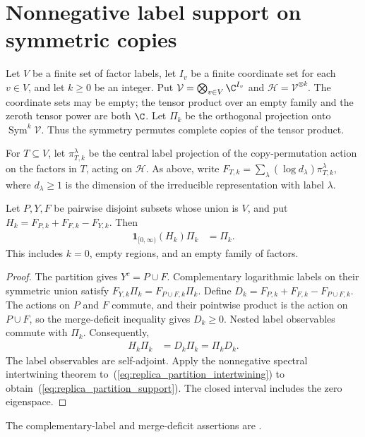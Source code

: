 \section{Nonnegative label support on symmetric copies}
\label{sec:replica_partition_nonnegative_support}

Let $V$ be a finite set of factor labels, let $I_v$ be a finite coordinate
set for each $v\in V$, and let $k\geq0$ be an integer. Put
$\mathcal V=\bigotimes_{v\in V}\C^{I_v}$ and
$\mathcal H=\mathcal V^{\otimes k}$. The coordinate sets may be empty;
the tensor product over an empty family and the zeroth tensor power are
both $\C$. Let $\Pi_k$ be the orthogonal projection onto
$\operatorname{Sym}^k\mathcal V$. Thus the symmetry permutes complete
copies of the tensor product.

For $T\subseteq V$, let $\pi^\lambda_{T,k}$ be the central label projection
of the copy-permutation action on the factors in $T$, acting on
$\mathcal H$. As above, write
$F_{T,k}=\sum_\lambda(\log d_\lambda)\pi^\lambda_{T,k}$, where
$d_\lambda\geq1$ is the dimension of the irreducible representation
with label $\lambda$.

\begin{theorem}
    \label{thm:replica_partition_nonnegative_support}
    \leanok
    Let $P,Y,F$ be pairwise disjoint subsets whose union is $V$, and put
    $H_k=F_{P,k}+F_{F,k}-F_{Y,k}$. Then
    \begin{align}
        \mathbf1_{[0,\infty)}(H_k)\Pi_k & =\Pi_k.
        \label{eq:replica_partition_support}
    \end{align}
    This includes $k=0$, empty regions, and an empty family of factors.
\end{theorem}

\begin{proof}\leanok
    The partition gives $Y^c=P\cup F$. Complementary logarithmic labels
    on their symmetric union satisfy
    $F_{Y,k}\Pi_k=F_{P\cup F,k}\Pi_k$.
    Define $D_k=F_{P,k}+F_{F,k}-F_{P\cup F,k}$.
    The actions on $P$ and $F$ commute, and their pointwise product is
    the action on $P\cup F$, so the merge-deficit inequality gives
    $D_k\geq0$. Nested label observables commute with $\Pi_k$.
    Consequently,
    \begin{align}
        H_k\Pi_k & =D_k\Pi_k=\Pi_kD_k.
        \label{eq:replica_partition_intertwining}
    \end{align}
    The label observables are self-adjoint. Apply the nonnegative
    spectral intertwining theorem to~(\ref{eq:replica_partition_intertwining})
    to obtain~(\ref{eq:replica_partition_support}). The closed interval
    includes the zero eigenspace.
\end{proof}

The complementary-label and merge-deficit assertions are
\cite[Lemma~6.1(2--3)]{OpenAI2026AreaLaw}.
